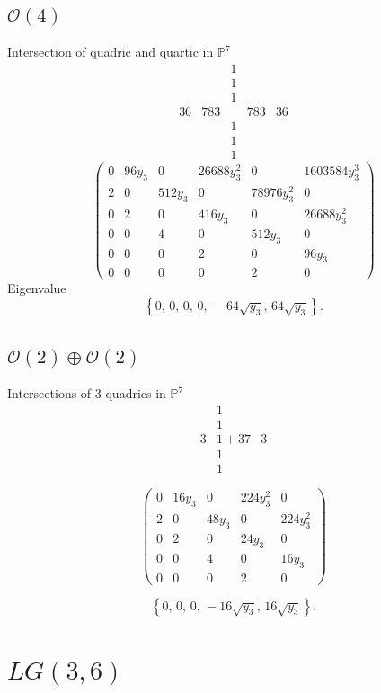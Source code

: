 \documentclass[11pt]{amsart}
\begin{document}
\subsection{$\mathcal{O}(4)$}
Intersection of quadric and quartic in $\mathbb{P}^7$
\[
\begin{array}{ccccc}
     &&1&&  \\
     &&1&&\\
     &&1&&\\
     36&783&&783&36\\
        &&1&&  \\
     &&1&&\\
     &&1&&
\end{array}
\]
\[
\begin{pmatrix}
0 & 96y_{3} & 0 & 26688y_{3}^{2} & 0 & 1603584y_{3}^{3} \\
2 & 0 & 512y_{3} & 0 & 78976y_{3}^{2} & 0 \\
0 & 2 & 0 & 416y_{3} & 0 & 26688y_{3}^{2} \\
0 & 0 & 4 & 0 & 512y_{3} & 0 \\
0 & 0 & 0 & 2 & 0 & 96y_{3} \\
0 & 0 & 0 & 0 & 2 & 0
\end{pmatrix}
\]
Eigenvalue
\[
\left\{
0,\,
0,\,
0,\,
0,\,
-64\sqrt{y_{3}},\,
64\sqrt{y_{3}}
\right\}.
\]
\subsection{$\mathcal{O}(2)\oplus \mathcal{O}(2)$}
Intersections of 3 quadrics in $\mathbb{P}^7$
\[
\begin{array}{ccc}
     &1&  \\
     &1&\\
     3&1+37&3\\
     &1&\\
     &1&
\end{array}
\]

\[
\begin{pmatrix}
0 & 16y_{3} & 0 & 224y_{3}^{2} & 0 \\
2 & 0 & 48y_{3} & 0 & 224y_{3}^{2} \\
0 & 2 & 0 & 24y_{3} & 0 \\
0 & 0 & 4 & 0 & 16y_{3} \\
0 & 0 & 0 & 2 & 0
\end{pmatrix}
\]

\[
\left\{
0,\,
0,\,
0,\,
-16\sqrt{y_{3}},\,
16\sqrt{y_{3}}
\right\}.
\]


\section{$LG(3,6)$}
\end{document}
